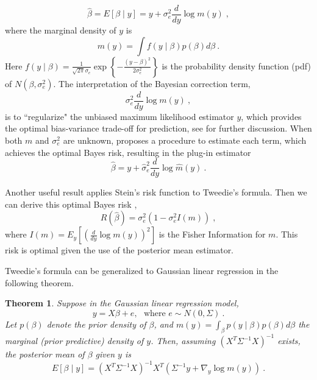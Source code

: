 \documentclass[11pt]{article}%
\numberwithin{equation}{section}
\theoremstyle{plain}
\newtheorem{thm}{Theorem}[section]
\begin{document}
\begin{equation}
\label{eq:tweedie}
\hat{\beta} = E\left[ \beta \mid y \right] = y + \sigma_e^2\frac{d}{dy} \log m(y) \; ,
\end{equation}
where the marginal density of $y$ is
$$
m(y) = \int f\left( y \mid \beta\right) p( \beta ) d \beta \ .
$$
Here $f\left(y\mid\beta\right) = \frac{1}{\sqrt{2\pi}\sigma_e}\exp\left\{-\frac{(y - \beta)^2}{2\sigma_e^2}\right\}$ is the probability density function (pdf) of $N(\beta, \sigma_e^2)$.  The interpretation of the Bayesian correction term,
$$
\sigma_e^2\frac{d}{dy} \log m(y) \ ,
$$
is to ``regularize" the unbiased maximum likelihood estimator $y$, which provides the optimal bias-variance trade-off for prediction, see \cite{pericchi1992} for further discussion.  When both $m$ and $\sigma_e^2$ are unknown, \cite{donoho2013} proposes a procedure to estimate each term, which achieves the optimal Bayes risk, resulting in the plug-in estimator
$$
\hat\beta = y + \hat\sigma_e^2\frac{d}{dy} \log \hat m(y) \ .
$$

Another useful result applies Stein's risk function to Tweedie's formula.  Then we can derive this optimal Bayes risk \citep{robbins1956},
$$
R(\hat\beta) = \sigma_e^2\left(1 - \sigma_e^2 I\left(m\right)\right) \; ,
$$
where $I(m) = E_y\left[\left(\frac{d}{dy}\log m(y)\right)^2\right]$ is the Fisher Information for $m$.  This risk is optimal given the use of the posterior mean estimator.

Tweedie's formula can be generalized to Gaussian linear regression in the following theorem.

\begin{thm} Suppose in the Gaussian linear regression model,
$$
y = X\beta + e, \ \ \ \text{where } e\sim N\left(0, \Sigma\right) \ .
$$
Let $p\left(\beta\right)$ denote the prior density of $\beta$, and $m\left(y\right) = \int_\beta p\left(y \mid \beta\right)p\left(\beta\right)d\beta$ the marginal (prior predictive) density of $y$.  Then, assuming $\left(X^T\Sigma^{-1}X\right)^{-1}$ exists, the posterior mean of $\beta$ given $y$ is
\begin{equation}
\label{eq:lspmbeta}
E\left[\beta\mid y\right]
=
\left(X^T\Sigma^{-1}X\right)^{-1}X^T\left(\Sigma^{-1}y + \nabla_y\log m\left(y\right)\right) \ .
\end{equation}
\end{thm}
\end{document}
